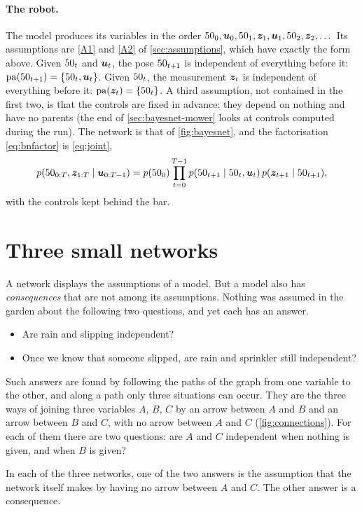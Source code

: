 \paragraph{The robot.} The model produces its variables in the order
$50_0,\bm{u}_0,50_1,\bm{z}_1,\bm{u}_1,50_2,\bm{z}_2,\dots$ Its assumptions are \ref{A1}
and \ref{A2} of \cref{sec:assumptions}, which have exactly the form above.
Given $50_t$ and $\bm{u}_t$, the pose $50_{t+1}$ is independent of everything
before it: $\mathrm{pa}(50_{t+1})=\{50_t,\bm{u}_t\}$. Given $50_t$, the
measurement $\bm{z}_t$ is independent of everything before it:
$\mathrm{pa}(\bm{z}_t)=\{50_t\}$. A third assumption, not contained in the
first two, is that the controls are fixed in advance: they depend on
nothing and have no parents (the end of
\cref{sec:bayesnet-mower} looks at controls computed during the run). The network is that of \cref{fig:bayesnet}, and the factorisation
\eqref{eq:bnfactor} is \eqref{eq:joint},
\[
  p(50_{0:T},\bm{z}_{1:T}\mid\bm{u}_{0:T-1})=p(50_0)\prod_{t=0}^{T-1}
  p(50_{t+1}\mid50_t,\bm{u}_t)\,p(\bm{z}_{t+1}\mid50_{t+1}),
\]
with the controls kept behind the bar.

\section{Three small networks}
\label{sec:three}

A network displays the assumptions of a model. But a model also has
\emph{consequences} that are not among its assumptions. Nothing was
assumed in the garden about the following two questions, and yet each has
an answer.
\begin{itemize}[nosep]
  \item Are rain and slipping independent?
  \item Once we know that someone slipped, are rain and sprinkler still
    independent?
\end{itemize}
Such answers are found by following the paths of the graph from one
variable to the other, and along a path only three situations can occur.
They are the three ways of joining three variables $A$, $B$, $C$ by an
arrow between $A$ and $B$ and an arrow between $B$ and $C$, with no arrow
between $A$ and $C$ (\cref{fig:connections}). For each of them there are
two questions: are $A$ and $C$ independent when nothing is given, and when
$B$ is given?

In each of the three networks, one of the two answers is the assumption
that the network itself makes by having no arrow between $A$ and $C$. The
other answer is a consequence.

